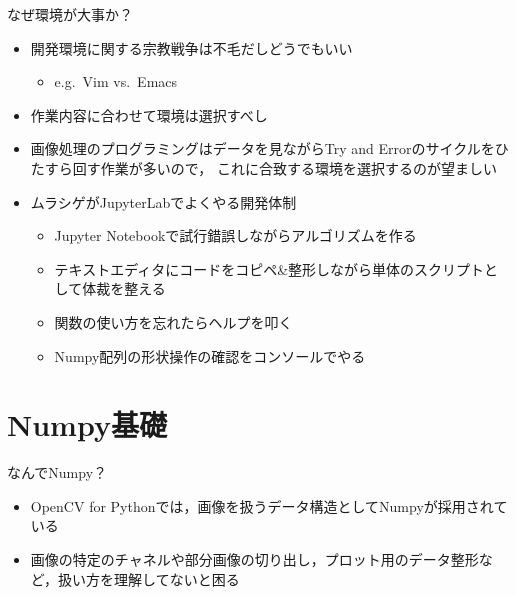 \documentclass[10pt]{beamer}
\begin{document}
	\begin{frame}{なぜ環境が大事か？}
	    \begin{itemize}
            \item 開発環境に関する宗教戦争は不毛だしどうでもいい
                \begin{itemize}
                    \item e.g.\ Vim vs.\ Emacs
                \end{itemize}
            \item 作業内容に合わせて環境は選択すべし
            \item 画像処理のプログラミングはデータを見ながらTry and Errorのサイクルをひたすら回す作業が多いので，
                これに合致する環境を選択するのが望ましい
            \item ムラシゲがJupyterLabでよくやる開発体制
                \begin{itemize}
                    \item Jupyter Notebookで試行錯誤しながらアルゴリズムを作る
                    \item テキストエディタにコードをコピペ\&整形しながら単体のスクリプトとして体裁を整える
                    \item 関数の使い方を忘れたらヘルプを叩く
                    \item Numpy配列の形状操作の確認をコンソールでやる
                \end{itemize}
	    \end{itemize}
	\end{frame}
	
	\section{Numpy基礎}
	
	\begin{frame}{なんでNumpy？}
	    \begin{itemize}
	        \item OpenCV for Pythonでは，画像を扱うデータ構造としてNumpyが採用されている
	        \item 画像の特定のチャネルや部分画像の切り出し，プロット用のデータ整形など，扱い方を理解してないと困る
	    \end{itemize}
	\end{frame}
	
\end{document}
